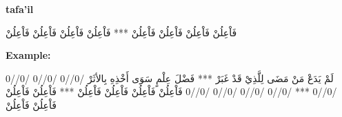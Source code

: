 \textbf{tafa'il}

\begin{Arabic}
  \begin{traditionalpoem*}
فَاْعِلُنْ فَاْعِلُنْ فَاْعِلُنْ فَاْعِلُنْ *** فَاْعِلُنْ فَاْعِلُنْ فَاْعِلُنْ فَاْعِلُنْ


    
	\end{traditionalpoem*}
      \end{Arabic}


\textbf{Example:}

\begin{Arabic}
  \begin{traditionalpoem*}

    لَمْ يَدَعْ مَنْ مَضَى لِلَّذِيْ قَدْ غَبَرْ *** فَضْلَ عِلْمٍ سَوَى أَخْذِهِ بِالأثَرْ
    /0//0 /0//0 /0//0 /0//0 *** /0//0 /0//0 /0//0 /0//0
    فَاْعِلُنْ فَاْعِلُنْ فَاْعِلُنْ فَاْعِلُنْ *** فَاْعِلُنْ فَاْعِلُنْ فَاْعِلُنْ فَاْعِلُنْ


    
          
	\end{traditionalpoem*}
      \end{Arabic}

      \newpage